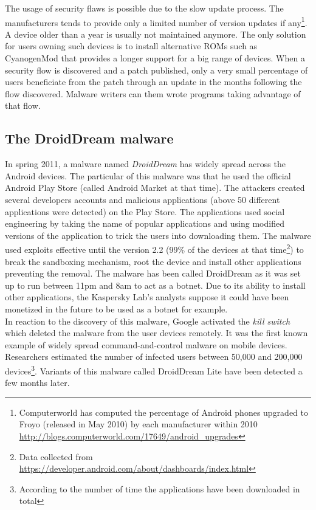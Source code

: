 The usage of security flaws is possible due to the slow update process.
The manufacturers tends to provide only a limited number of version updates if any\footnote{Computerworld has computed the percentage of Android phones upgraded to Froyo (released in May 2010) by each manufacturer within 2010 \url{http://blogs.computerworld.com/17649/android_upgrades}}.
A device older than a year is usually not maintained anymore.
The only solution for users owning such devices is to install alternative ROMs such as CyanogenMod that provides a longer support for a big range of devices.
When a security flow is discovered and a patch published, only a very small percentage of users beneficiate from the patch through an update in the months following the flow discovered.
Malware writers can them wrote programs taking advantage of that flow.\\

\subsection{The DroidDream malware}

In spring 2011, a malware named \emph{DroidDream} has widely spread across the Android devices.
The particular of this malware was that he used the official Android Play Store (called Android Market at that time).
The attackers created several developers accounts and malicious applications (above 50 different applications were detected) on the Play Store.
The applications used social engineering by taking the name of popular applications and using modified versions of the application to trick the users into downloading them.
The malware used exploits effective until the version 2.2 (99\% of the devices at that time\footnote{Data collected from \url{https://developer.android.com/about/dashboards/index.html}}) to break the sandboxing mechanism, root the device and install other applications preventing the removal.
The malware has been called DroidDream as it was set up to run between 11pm and 8am to act as a botnet.
Due to its ability to install other applications, the Kaspersky Lab's analysts suppose it could have been monetized in the future to be used as a botnet for example.\\

In reaction to the discovery of this malware, Google activated the \emph{kill switch} which deleted the malware from the user devices remotely.
It was the first known example of widely spread command-and-control malware on mobile devices.
Researchers estimated the number of infected users between 50,000 and 200,000 devices\footnote{According to the number of time the applications have been downloaded in total}.
Variants of this malware called DroidDream Lite have been detected a few months later.

